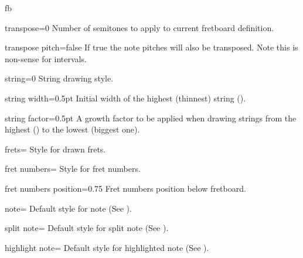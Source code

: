 \documentclass[a4paper]{article}
\begin{document}
\begin{docEnvironment}{fb}{}
\begin{docKey}[fb][]{transpose}{=}{0}
  Number of semitones to apply to current fretboard definition.
\end{docKey}

\begin{docKey}[fb][]{transpose pitch}{=}{false}
  If true the note pitches will also be transposed. Note this is non-sense
  for intervals.
\end{docKey}

\begin{docKey}[fb][]{string}{=}{0}
  String drawing style.
\end{docKey}

\begin{docKey}[fb][]{string width}{=}{0.5pt}
  Initial width of the highest (thinnest) string ().
\end{docKey}

\begin{docKey}[fb][]{string factor}{=}{0.5pt}
  A growth factor to be applied when drawing strings from the highest
  () to the lowest (biggest one).
\end{docKey}

\begin{docKey}[fb][]{frets}{=}{}
  Style for drawn frets.
\end{docKey}

\begin{docKey}[fb][]{fret numbers}{=}{}
  Style for fret numbers.
\end{docKey}

\begin{docKey}[fb][]{fret numbers position}{=}{0.75}
  Fret numbers position below fretboard.
\end{docKey}

\begin{docKey}[fb][]{note}{=}{}
  Default style for note (See ).
\end{docKey}

\begin{docKey}[fb][]{split note}{=}{}
  Default style for split note (See ).
\end{docKey}

\begin{docKey}[fb][]{highlight note}{=}{}
  Default style for highlighted note (See ).
\end{docKey}


\end{docEnvironment}
\end{document}
